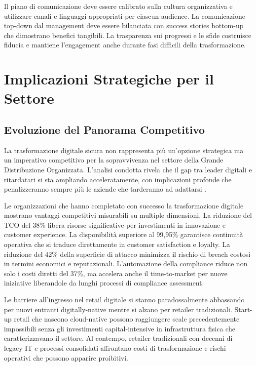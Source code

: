 Il piano di comunicazione deve essere calibrato sulla cultura organizzativa e utilizzare canali e linguaggi appropriati per ciascun audience. La comunicazione top-down dal management deve essere bilanciata con success stories bottom-up che dimostrano benefici tangibili. La trasparenza sui progressi e le sfide costruisce fiducia e mantiene l'engagement anche durante fasi difficili della trasformazione.

\section{Implicazioni Strategiche per il Settore}

\subsection{Evoluzione del Panorama Competitivo}

La trasformazione digitale sicura non rappresenta più un'opzione strategica ma un imperativo competitivo per la sopravvivenza nel settore della Grande Distribuzione Organizzata. L'analisi condotta rivela che il gap tra leader digitali e ritardatari si sta ampliando acceleratamente, con implicazioni profonde che penalizzeranno sempre più le aziende che tarderanno ad adattarsi \autocite{gartner2024retail}.

Le organizzazioni che hanno completato con successo la trasformazione digitale mostrano vantaggi competitivi misurabili su multiple dimensioni. La riduzione del TCO del 38\% libera risorse significative per investimenti in innovazione e customer experience. La disponibilità superiore al 99,95\% garantisce continuità operativa che si traduce direttamente in customer satisfaction e loyalty. La riduzione del 42\% della superficie di attacco minimizza il rischio di breach costosi in termini economici e reputazionali. L'automazione della compliance riduce non solo i costi diretti del 37\%, ma accelera anche il time-to-market per nuove iniziative liberandole da lunghi processi di compliance assessment.

Le barriere all'ingresso nel retail digitale si stanno paradossalmente abbassando per nuovi entranti digitally-native mentre si alzano per retailer tradizionali. Start-up retail che nascono cloud-native possono raggiungere scale precedentemente impossibili senza gli investimenti capital-intensive in infrastruttura fisica che caratterizzavano il settore. Al contempo, retailer tradizionali con decenni di legacy IT e processi consolidati affrontano costi di trasformazione e rischi operativi che possono apparire proibitivi.


